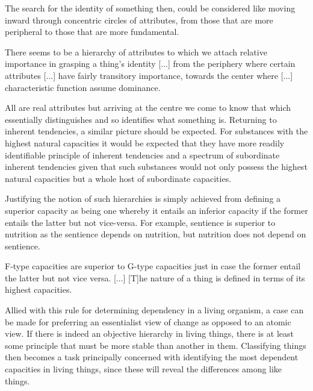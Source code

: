 The search for the identity of something then, could be considered like moving inward through concentric circles of attributes, from those that are more peripheral to those that are more fundamental.
\begin{quoting}
There seems to be a hierarchy of attributes to which we attach relative importance in grasping a thing's identity [...] from the periphery where certain attributes [...] have fairly transitory importance, towards the center where [...] characteristic function assume dominance. \parencite[][79]{Oderberg2005-ODEHD}
\end{quoting}
All are real attributes but arriving at the centre we come to know that which essentially distinguishes and so identifies what something is. Returning to inherent tendencies, a similar picture should be expected. For substances with the highest natural capacities it would be expected that they have more readily identifiable principle of inherent tendencies and a spectrum of subordinate inherent tendencies given that such substances would not only possess the highest natural capacities but a whole host of subordinate capacities.

Justifying the notion of such hierarchies is simply achieved from defining a superior capacity as being one whereby it entails an inferior capacity if the former entails the latter but not vice-versa. For example, sentience is superior to nutrition as the sentience depends on nutrition, but nutrition does not depend on sentience.
\begin{quoting}
F-type capacities are superior to G-type capacities just in case the former entail the latter but not vice versa. [...] [T]he nature of a thing is defined in terms of its highest capacities.
\parencite[][88]{Oderberg2005-ODEHD}
\end{quoting}

Allied with this rule for determining dependency in a living organism, a case can be made for preferring an essentialist view of change as opposed to an atomic view. If there is indeed an objective hierarchy in living things, there is at least some principle that must be more stable than another in them. Classifying things then becomes a task principally concerned with identifying the most dependent capacities in living things, since these will reveal the differences among like things.


